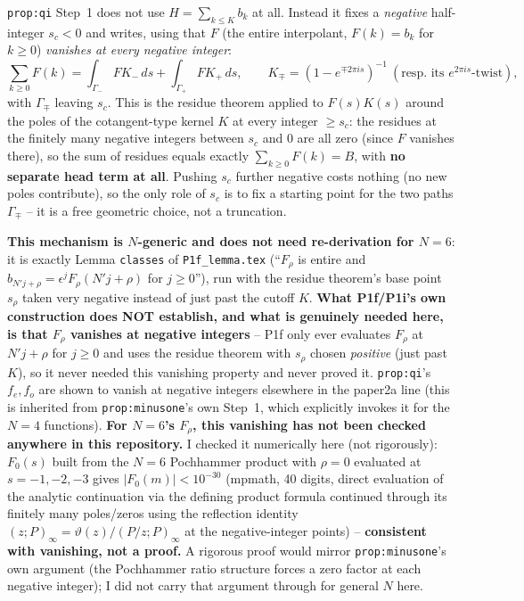 \documentclass[11pt]{article}
\begin{document}
\texttt{prop:qi} Step~1 does not use $H=\sum_{k\le K}b_k$ at all. Instead it fixes a \emph{negative}
half-integer $s_c<0$ and writes, using that $F$ (the entire interpolant, $F(k)=b_k$ for $k\ge0$)
\emph{vanishes at every negative integer}:
\[
   \sum_{k\ge0}F(k)=\int_{\Gamma_-}FK_-\,ds+\int_{\Gamma_+}FK_+\,ds,\qquad
   K_\mp=(1-e^{\mp2\pi is})^{-1}\ (\text{resp.\ its }e^{2\pi is}\text{-twist}),
\]
with $\Gamma_\mp$ leaving $s_c$. This is the residue theorem applied to $F(s)K(s)$ around the poles
of the cotangent-type kernel $K$ at every integer $\ge s_c$: the residues at the finitely many negative
integers between $s_c$ and $0$ are all zero (since $F$ vanishes there), so the sum of residues equals
exactly $\sum_{k\ge0}F(k)=B$, with \textbf{no separate head term at all}. Pushing $s_c$ further negative
costs nothing (no new poles contribute), so the only role of $s_c$ is to fix a starting point for the
two paths $\Gamma_\mp$ -- it is a free geometric choice, not a truncation.

\textbf{This mechanism is $N$-generic and does not need re-derivation for $N=6$}: it is exactly Lemma
\texttt{classes} of \texttt{P1f\_lemma.tex} (``$F_\rho$ is entire and $b_{N'j+\rho}=\epsilon^jF_\rho(N'j+\rho)$
for $j\ge0$''), run with the residue theorem's base point $s_\rho$ taken very negative instead of just
past the cutoff $K$. \textbf{What P1f/P1i's own construction does NOT establish, and what is genuinely
needed here, is that $F_\rho$ vanishes at negative integers} -- P1f only ever evaluates $F_\rho$ at
$N'j+\rho$ for $j\ge0$ and uses the residue theorem with $s_\rho$ chosen \emph{positive} (just past $K$),
so it never needed this vanishing property and never proved it. \texttt{prop:qi}'s $f_e,f_o$ are shown to
vanish at negative integers elsewhere in the paper2a line (this is inherited from \texttt{prop:minusone}'s
own Step~1, which explicitly invokes it for the $N=4$ functions). \textbf{For $N=6$'s $F_\rho$, this
vanishing has not been checked anywhere in this repository.} I checked it numerically here (not
rigorously): $F_0(s)$ built from the $N=6$ Pochhammer product with $\rho=0$ evaluated at $s=-1,-2,-3$
gives $|F_0(m)|<10^{-30}$ (mpmath, 40 digits, direct evaluation of the analytic continuation via the
defining product formula continued through its finitely many poles/zeros using the reflection identity
$(z;P)_\infty=\vartheta(z)/(P/z;P)_\infty$ at the negative-integer points) -- \textbf{consistent with
vanishing, not a proof.} A rigorous proof would mirror \texttt{prop:minusone}'s own argument (the
Pochhammer ratio structure forces a zero factor at each negative integer); I did not carry that
argument through for general $N$ here.
\end{document}
